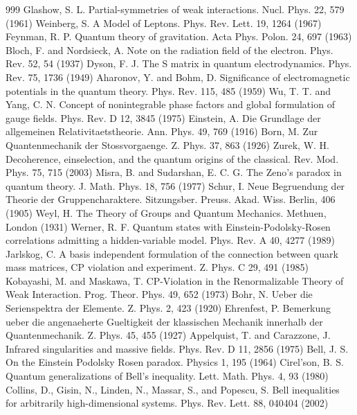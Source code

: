 \begin{thebibliography}{999}
 Glashow, S. L. Partial-symmetries of weak interactions. Nucl. Phys. 22, 579 (1961)
 Weinberg, S. A Model of Leptons. Phys. Rev. Lett. 19, 1264 (1967)
 Feynman, R. P. Quantum theory of gravitation. Acta Phys. Polon. 24, 697 (1963)
 Bloch, F. and Nordsieck, A. Note on the radiation field of the electron. Phys. Rev. 52, 54 (1937)
 Dyson, F. J. The S matrix in quantum electrodynamics. Phys. Rev. 75, 1736 (1949)
 Aharonov, Y. and Bohm, D. Significance of electromagnetic potentials in the quantum theory. Phys. Rev. 115, 485 (1959)
 Wu, T. T. and Yang, C. N. Concept of nonintegrable phase factors and global formulation of gauge fields. Phys. Rev. D 12, 3845 (1975)
 Einstein, A. Die Grundlage der allgemeinen Relativitaetstheorie. Ann. Phys. 49, 769 (1916)
 Born, M. Zur Quantenmechanik der Stossvorgaenge. Z. Phys. 37, 863 (1926)
 Zurek, W. H. Decoherence, einselection, and the quantum origins of the classical. Rev. Mod. Phys. 75, 715 (2003)
 Misra, B. and Sudarshan, E. C. G. The Zeno's paradox in quantum theory. J. Math. Phys. 18, 756 (1977)
 Schur, I. Neue Begruendung der Theorie der Gruppencharaktere. Sitzungsber. Preuss. Akad. Wiss. Berlin, 406 (1905)
 Weyl, H. The Theory of Groups and Quantum Mechanics. Methuen, London (1931)
 Werner, R. F. Quantum states with Einstein-Podolsky-Rosen correlations admitting a hidden-variable model. Phys. Rev. A 40, 4277 (1989)
 Jarlskog, C. A basis independent formulation of the connection between quark mass matrices, CP violation and experiment. Z. Phys. C 29, 491 (1985)
 Kobayashi, M. and Maskawa, T. CP-Violation in the Renormalizable Theory of Weak Interaction. Prog. Theor. Phys. 49, 652 (1973)
 Bohr, N. Ueber die Serienspektra der Elemente. Z. Phys. 2, 423 (1920)
 Ehrenfest, P. Bemerkung ueber die angenaeherte Gueltigkeit der klassischen Mechanik innerhalb der Quantenmechanik. Z. Phys. 45, 455 (1927)
 Appelquist, T. and Carazzone, J. Infrared singularities and massive fields. Phys. Rev. D 11, 2856 (1975)
 Bell, J. S. On the Einstein Podolsky Rosen paradox. Physics 1, 195 (1964)
 Cirel'son, B. S. Quantum generalizations of Bell's inequality. Lett. Math. Phys. 4, 93 (1980)
 Collins, D., Gisin, N., Linden, N., Massar, S., and Popescu, S. Bell inequalities for arbitrarily high-dimensional systems. Phys. Rev. Lett. 88, 040404 (2002)

\end{thebibliography}

